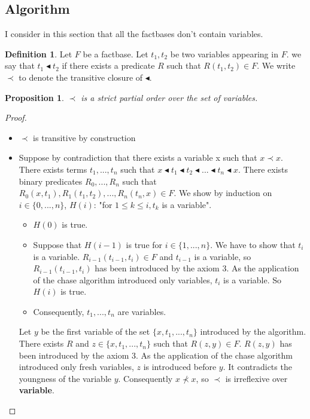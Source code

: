 \documentclass{article}
\newtheorem{proposition}{Proposition}[section]
\theoremstyle{definition}
\newtheorem{definition}{Definition}[section]
\theoremstyle{remark}
\begin{document}
\subsection{Algorithm}

I consider in this section that all the factbases don't contain variables.

\begin{definition}
Let $F$ be a factbase. Let $t_1,t_2$ be two variables appearing in $F$. we say that $t_1 \blacktriangleleft t_2$ if there exists a predicate $R$ such that $R(t_1,t_2) \in F$. We write $\prec$ to denote the transitive closure of $\blacktriangleleft$.
\end{definition}

\begin{proposition}
$\prec$ is a strict partial order over the set of variables.
\end{proposition}

\begin{proof}
\begin{itemize}
\item $\prec$ is transitive by construction
\item Suppose by contradiction that there exists a variable x such that $x \prec x$. There exists terms $t_1,...,t_n$ such that $x \blacktriangleleft t_1 \blacktriangleleft t_2 \blacktriangleleft ... \blacktriangleleft t_n \blacktriangleleft x$. There exists binary predicates $R_0,...,R_n$ such that $R_0(x,t_1),R_1(t_1,t_2),...,R_n(t_n,x) \in F$. We show by induction on $i\in \{0,...,n\}$, $H(i)$: "for $1 \leq k \leq i,t_k$ is a variable".
\begin{itemize}
\item $H(0)$ is true.
\item Suppose that $H(i-1)$ is true for $i \in \{1,...,n\}$. We have to show that $t_i$ is a variable. $R_{i-1}(t_{i-1},t_i) \in F$ and $t_{i-1}$ is a variable, so $R_{i-1}(t_{i-1},t_i)$ has been introduced by the axiom 3. As the application of the chase algorithm introduced only variables, $t_i$ is a variable. So $H(i)$ is true.
\item Consequently, $t_1,...,t_n$ are variables.
\end{itemize}
Let $y$ be the first variable of the set $\{x,t_1,...,t_n\}$  introduced by the algorithm. There exists $R$ and $z \in \{x,t_1,...,t_n\}$ such that $R(z,y) \in F$. $R(z,y)$ has been introduced by the axiom 3. As the application of the chase algorithm introduced only fresh variables, $z$ is introduced before $y$. It contradicts the youngness of the variable $y$. Consequently $x \nprec x$, so $\prec$ is irreflexive over \textbf{variable}.
\end{itemize}
\end{proof}
\end{document}
